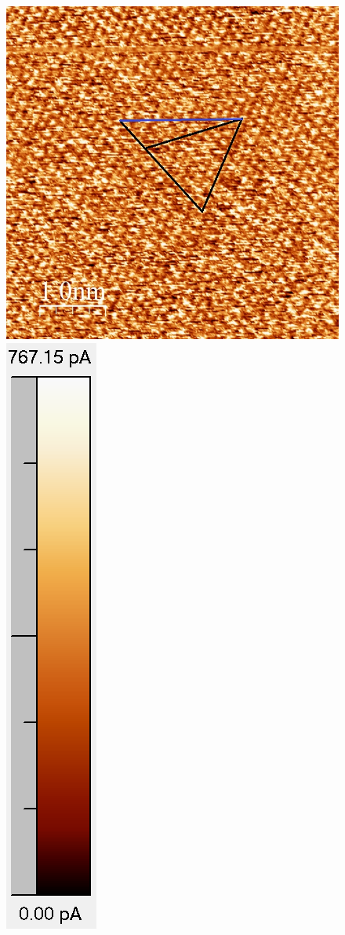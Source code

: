 \documentclass[12pt,a4paper]{article}
\begin{document}
\begin{figure}[H]
\centering
\includegraphics[scale=0.36]{Bilder/Atome/hoch5_h.jpg}
\includegraphics[scale=0.48]{Bilder/Atome/hoch5_scale.png}

\end{figure}
\end{document}
